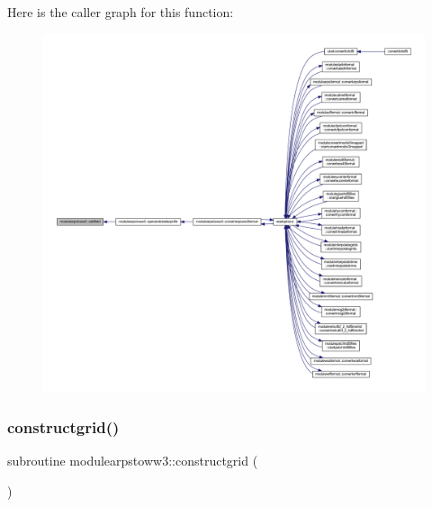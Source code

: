 Here is the caller graph for this function\+:\nopagebreak
\begin{figure}[H]
\begin{center}
\leavevmode
\includegraphics[width=350pt]{namespacemodulearpstoww3_a0277d24244051759af2fcc3106ef5a08_icgraph}
\end{center}
\end{figure}
\mbox{\label{namespacemodulearpstoww3_a509b1aea6540dc5784cfe7424f0e6414}} 
\subsubsection{\texorpdfstring{constructgrid()}{constructgrid()}}
{\footnotesize\ttfamily subroutine modulearpstoww3\+::constructgrid (\begin{DoxyParamCaption}{ }\end{DoxyParamCaption})\hspace{0.3cm}{\ttfamily [private]}}

